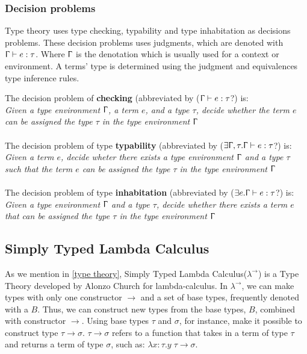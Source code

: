 \subsubsection{Decision problems}
Type theory uses type checking, typability and type inhabitation as decisions problems. These decision problems uses judgments, which are denoted with $\Upgamma \vdash e:\tau$. Where $\Upgamma$ is the denotation which is usually used for a context or environment. A terms' type is determined using the judgment and equivalences type inference rules. 

\para
The decision problem of \textbf{checking} (abbreviated by ($\Upgamma\vdash e : \tau$?) is:\\
\textit{Given a type environment $\Upgamma$, a term $e$, and a type $\tau$, decide whether the term $e$ can be assigned the type $\tau$ in the type environment $\Upgamma$} \\ \\
The decision problem of type \textbf{typability} (abbreviated by ($ \exists \Upgamma,\tau .\Upgamma\vdash e : \tau$?) is: \\ 
\textit{Given  a term $e$, decide wheter there exists a type environment $\Upgamma$ and a type $\tau$ such that the term $e$ can be assigned the type $\tau$ in the type environment $\Upgamma$} \\ \\ 
The decision problem of type \textbf{inhabitation} (abbreviated by ($ \exists e.\Upgamma \vdash e : \tau$?) is: \\
\textit{Given a type environment $\Upgamma$ and a type $\tau$, decide whether there exists a term $e$ that can be assigned the type $\tau$ in the type environment $\Upgamma$}

\subsection{Simply Typed Lambda Calculus}
\label{Simply Typed Lambda Calculus}
As we mention in \autoref{type theory}, Simply Typed Lambda Calculus($\lambda^\rightarrow$) is a Type Theory developed by Alonzo Church for lambda-calculus. In $\lambda^\rightarrow$, we can make types with only one constructor $\rightarrow$ and a set of base types, frequently denoted with a $B$. Thus, we can construct new types from the base types, $B$, combined with constructor $\rightarrow$. Using base types $\tau$ and $\sigma$, for instance, make it possible to construct type $\tau \rightarrow \sigma$. $\tau \rightarrow \sigma$ refers to a function that takes in a term of type $\tau$ and returns a term of type $\sigma$, such as: $\lambda x:\tau. y \; \tau \rightarrow \sigma$. 


